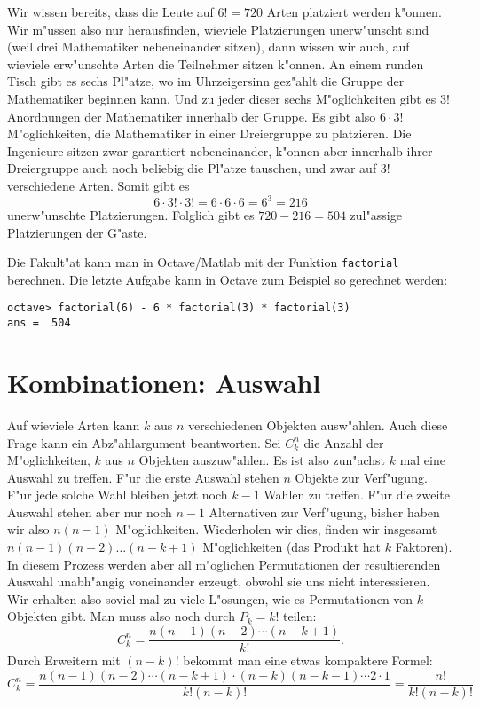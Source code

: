 \begin{beispiele}
\begin{loesung}
\begin{teilaufgaben}
Wir wissen bereits, dass die Leute auf $6!=720$ Arten platziert werden
k"onnen.
Wir m"ussen also nur herausfinden, wieviele Platzierungen
unerw"unscht sind (weil drei Mathematiker nebeneinander sitzen),
dann wissen wir auch, auf wieviele erw"unschte Arten die Teilnehmer
sitzen k"onnen.
An einem runden Tisch gibt es sechs Pl"atze, wo im Uhrzeigersinn gez"ahlt 
die Gruppe der Mathematiker beginnen kann.
Und zu jeder dieser
sechs M"oglichkeiten gibt es $3!$ Anordnungen der Mathematiker innerhalb
der Gruppe.
Es gibt also $6 \cdot 3!$ M"oglichkeiten, die Mathematiker
in einer Dreiergruppe zu platzieren.
Die Ingenieure sitzen zwar garantiert nebeneinander, k"onnen aber
innerhalb ihrer Dreiergruppe auch noch beliebig die Pl"atze
tauschen, und zwar auf $3!$ verschiedene Arten.
Somit gibt es
\[
6\cdot 3!\cdot 3!=6\cdot 6\cdot 6=6^3=216
\]
unerw"unschte Platzierungen.
Folglich gibt es $720-216=504$ zul"assige
Platzierungen der G"aste.
\end{teilaufgaben}
\end{loesung}

\end{beispiele}

Die Fakult"at kann man in Octave/Matlab mit der Funktion {\tt factorial}
berechnen.
Die letzte Aufgabe kann in Octave zum Beispiel so gerechnet
werden:
\begin{verbatim}
octave> factorial(6) - 6 * factorial(3) * factorial(3)
ans =  504
\end{verbatim}

\section{Kombinationen: Auswahl}
Auf wieviele Arten kann $k$ aus $n$ verschiedenen Objekten
ausw"ahlen.
Auch diese Frage kann ein Abz"ahlargument
beantworten.
Sei $C^n_k$ die Anzahl der M"oglichkeiten,
$k$ aus $n$ Objekten auszuw"ahlen.
Es ist also zun"achst
$k$ mal eine Auswahl zu treffen.
F"ur die erste Auswahl stehen $n$ Objekte zur Verf"ugung.
F"ur jede solche Wahl bleiben jetzt noch $k-1$ Wahlen zu treffen.
F"ur die zweite
Auswahl stehen aber nur noch $n-1$ Alternativen zur Verf"ugung,
bisher haben wir also $n(n-1)$ M"oglichkeiten.
Wiederholen wir
dies, finden wir insgesamt $n(n-1)(n-2)\dots(n-k+1)$ M"oglichkeiten
(das Produkt hat $k$ Faktoren).
In diesem Prozess werden
aber all m"oglichen Permutationen der resultierenden Auswahl
unabh"angig voneinander erzeugt, obwohl sie uns nicht
interessieren.
Wir erhalten also soviel mal zu viele L"osungen, wie
es Permutationen von $k$ Objekten gibt.
Man muss also noch durch
$P_k=k!$ teilen:
\[
C^n_k=\frac{n(n-1)(n-2)\dotsm(n-k+1)}{k!}.
\]
Durch Erweitern mit $(n-k)!$ bekommt man eine etwas
kompaktere Formel:
\[
C^n_k=\frac{n(n-1)(n-2)\dotsm(n-k+1)\cdot(n-k)(n-k-1)\dotsm2\cdot 1}{k!(n-k)!}
=\frac{n!}{k!(n-k)!}
\]

